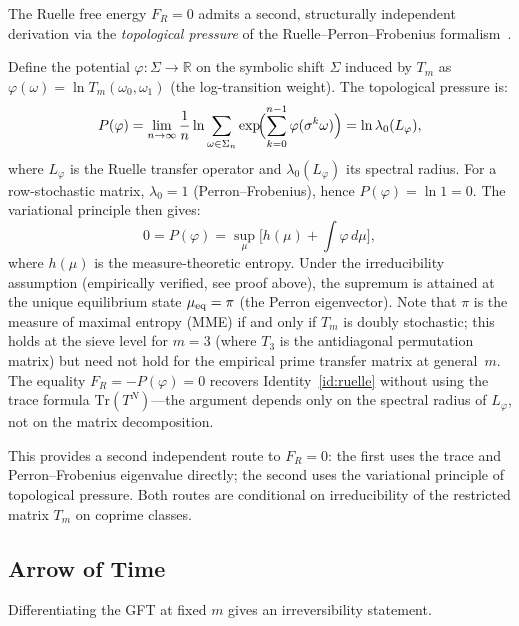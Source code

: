 \documentclass[12pt,a4paper]{article}
\begin{document}
\begin{remark}[Topological pressure route: second proof of $F_R = 0$]
\label{rem:ruelle_pressure}
The Ruelle free energy $F_R = 0$ admits a second, structurally
independent derivation via the \emph{topological pressure} of the
Ruelle--Perron--Frobenius formalism~\cite{Ruelle1978}.

Define the potential $\varphi : \Sigma \to \mathbb{R}$ on the symbolic
shift $\Sigma$ induced by $T_m$ as $\varphi(\omega) = \ln T_m(\omega_0, \omega_1)$
(the log-transition weight).  The topological pressure is:
\[
  P(\varphi) = \lim_{n \to \infty} \frac{1}{n}
    \ln \sum_{\omega \in \Sigma_n} \exp\!\Bigl(\sum_{k=0}^{n-1}\varphi(\sigma^k\omega)\Bigr)
  = \ln \lambda_0(L_\varphi),
\]
where $L_\varphi$ is the Ruelle transfer operator and $\lambda_0(L_\varphi)$
its spectral radius.  For a row-stochastic matrix, $\lambda_0 = 1$
(Perron--Frobenius), hence $P(\varphi) = \ln 1 = 0$.
The variational principle then gives:
\[
  0 = P(\varphi) = \sup_\mu \bigl[h(\mu) + \int \varphi\,d\mu\bigr],
\]
where $h(\mu)$ is the measure-theoretic entropy.
Under the irreducibility assumption (empirically verified, see proof above),
the supremum is attained at the unique equilibrium state $\mu_{\rm eq} = \pi$
(the Perron eigenvector).
Note that $\pi$ is the measure of maximal entropy (MME) if and only if
$T_m$ is doubly stochastic; this holds at the sieve level for $m = 3$
(where $T_3$ is the antidiagonal permutation matrix) but need not hold
for the empirical prime transfer matrix at general~$m$.
The equality $F_R = -P(\varphi) = 0$
recovers Identity~\ref{id:ruelle} without using the trace formula
$\mathrm{Tr}(T^N)$---the argument depends only on the spectral
radius of $L_\varphi$, not on the matrix decomposition.

This provides a second independent route to $F_R = 0$: the first
uses the trace and Perron--Frobenius eigenvalue directly; the second
uses the variational principle of topological pressure.
Both routes are conditional on irreducibility of the restricted
matrix $T_m$ on coprime classes.
\end{remark}

\subsection{Arrow of Time}
\label{sec:arrow}

Differentiating the GFT at fixed $m$ gives an irreversibility statement.
\end{document}
